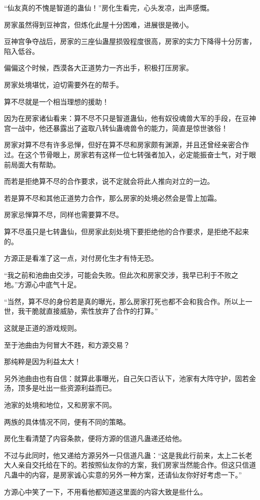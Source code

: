 \begin{this_body}
“仙友真的不愧是智道的蛊仙！”房化生看完，心头发凉，出声感慨。

房家虽然得到豆神宫，但炼化此屋十分困难，进展很是微小。

豆神宫争夺战后，房家的三座仙蛊屋损毁程度很高，房家的实力下降得十分厉害，陷入低谷。

偏偏这个时候，西漠各大正道势力一齐出手，积极打压房家。

房家处境堪忧，迫切需要外在的帮手。

算不尽就是一个相当理想的援助！

因为在房家诸仙看来：算不尽不只是智道蛊仙，他有奴役魂兽大军的手段，在豆神宫一战中，他还暴露出了盗取八转仙蛊魂兽令的能力，简直是惊世骇俗！

房家对算不尽有许多忌惮，但好在算不尽和房家颇有渊源，并且还曾经亲密合作过。在这个节骨眼上，房家若有这样一位七转强者加入，必定能振奋士气，对于眼前局面大有帮助。

而若是拒绝算不尽的合作要求，说不定就会将此人推向对立的一边。

若是算不尽和其他正道势力合作，那么房家的处境必然会是雪上加霜。

房家忌惮算不尽，同样也需要算不尽。

算不尽虽只是七转蛊仙，但房家此刻处境下要拒绝他的合作要求，是拒绝不起来的。

方源正是看准了这一点，对付房化生才有恃无恐。

“我之前和池曲由交涉，可能会失败。但此次和房家交涉，我早已利于不败之地。”方源心中底气十足。

“当然，算不尽的身份若是真的曝光，那么房家打死也都不会和我合作。所以上一世，我干脆就直接威胁，索性放弃了合作的打算。”

这就是正道的游戏规则。

至于池曲由为何冒大不韪，和方源交易？

那纯粹是因为利益太大！

另外池曲由也有自信：就算此事曝光，自己矢口否认下，池家有大阵守护，固若金汤，顶多是吐出一些资源利益而已。

池家的处境和地位，又和房家不同。

两族的具体情况不同，便有不同的策略。

房化生看清楚了内容条款，便将方源的信道凡蛊递还给他。

不过与此同时，他又递给方源另外一只信道凡蛊：“这是我此行前来，太上二长老大人亲自交托给在下的。若按照仙友你的方案，我们房家当然能合作。但这只信道凡蛊中的内容，是房家诚心实意的另外一种方案，还请仙友你好好考虑一下。”

方源心中笑了一下，不用看他都知道这里面的内容大致是些什么。


\end{this_body}
